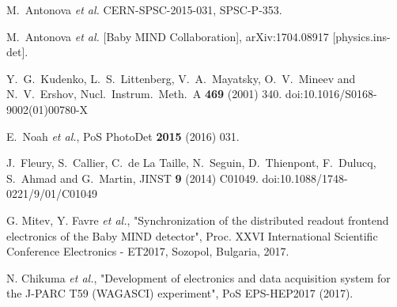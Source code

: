

\begin{thebibliography}{99}

M.~Antonova {\it et al.} CERN-SPSC-2015-031, SPSC-P-353.

  M.~Antonova {\it et al.} [Baby MIND Collaboration],
  arXiv:1704.08917 [physics.ins-det].

  Y.~G.~Kudenko, L.~S.~Littenberg, V.~A.~Mayatsky, O.~V.~Mineev and N.~V.~Ershov,
  Nucl.\ Instrum.\ Meth.\ A {\bf 469} (2001) 340.
  doi:10.1016/S0168-9002(01)00780-X

  E.~Noah {\it et al.},
  PoS PhotoDet {\bf 2015} (2016) 031.

  J.~Fleury, S.~Callier, C.~de La Taille, N.~Seguin, D.~Thienpont, F.~Dulucq, S.~Ahmad and G.~Martin,
  JINST {\bf 9} (2014) C01049.
  doi:10.1088/1748-0221/9/01/C01049

G. Mitev, Y. Favre {\it et al.}, "Synchronization of the distributed readout frontend electronics of the Baby MIND detector", Proc. XXVI International Scientific Conference Electronics - ET2017, Sozopol, Bulgaria, 2017.

N. Chikuma {\it et al.}, "Development of electronics and data acquisition system for the J-PARC T59 (WAGASCI) experiment", PoS EPS-HEP2017 (2017). 


\end{thebibliography}


